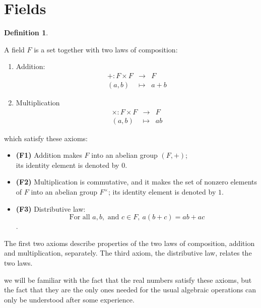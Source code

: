 \documentclass[
]{book}
\providecommand{\tightlist}{%
  \setlength{\itemsep}{0pt}\setlength{\parskip}{0pt}}
\theoremstyle{definition}
\newtheorem{definition}{Definition}[chapter]
\theoremstyle{definition}
\theoremstyle{definition}
\theoremstyle{definition}
\theoremstyle{remark}
\begin{document}
\hypertarget{fields}{%
\section{Fields}\label{fields}}

\begin{definition}
\protect\hypertarget{def:unnamed-chunk-73}{}\label{def:unnamed-chunk-73}

A field \(F\) is a set together with two laws of composition:

\begin{enumerate}
\def\labelenumi{\arabic{enumi}.}
\tightlist
\item
  Addition:
  \begin{eqnarray}
  +:F \times  F & \rightarrow & F \\
  (a,b) & \mapsto  & a+b
  \end{eqnarray}
\item
  Multiplication
  \begin{eqnarray}
  \times:F \times  F & \rightarrow & F \\
  (a,b) & \mapsto  & ab
  \end{eqnarray}
\end{enumerate}

which satisfy these axioms:

\begin{itemize}
\item
  \textbf{(F1)} Addition makes \(F\) into an abelian group \((F,+)\);\\
  its identity element is denoted by \(0\).
\item
  \textbf{(F2)} Multiplication is commutative, and it makes the set of nonzero elements of \(F\) into an abelian group \(F^{\times}\); its identity element is denoted by \(1\).
\item
  \textbf{(F3)} Distributive law:
  \[\text{For all } a, b,\text{ and } c \in F,~ a(b + c) = ab + ac\].
\end{itemize}

\end{definition}

The first two axioms describe properties of the two laws of composition, addition and multiplication, separately. The third axiom, the distributive law, relates the two laws.

we will be familiar with the fact that the real numbers satisfy these axioms, but the fact that they are the only ones needed for the usual algebraic operations can only be understood after some experience.
\end{document}
